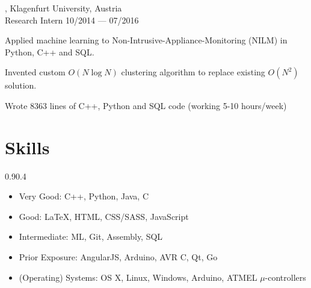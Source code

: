 \begin{entry}
	{, Klagenfurt University, Austria}
	{\\Research Intern}
	{10/2014 --- 07/2016}

\item Applied machine learning to Non-Intrusive-Appliance-Monitoring (NILM) in Python, C++ and SQL.
	\item Invented custom $O(N \log N)$ clustering algorithm to replace existing $O(N^2)$ solution.
	\item Wrote 8363 lines of C++, Python and SQL code (working 5-10 hours/week)
\end{entry}
\vspace{-2mm}

\section{Skills}{0.9}{0.4}
\vspace{-2mm}
\begin{multicols}{2}
	\begin{itemize}
		\item Very Good: C++, Python, Java, C
    \vspace{-2mm}
		\item Good: \LaTeX, HTML, CSS/SASS, JavaScript
    \vspace{-2mm}
		\item Intermediate: ML, Git, Assembly, SQL

		\item Prior Exposure: AngularJS, Arduino, AVR C, Qt, Go
    \vspace{-2mm}
		\item (Operating) Systems: OS X, Linux, Windows, Arduino, ATMEL $\mu$-controllers
    \\
	\end{itemize}
\end{multicols}

\vspace{-2mm}
